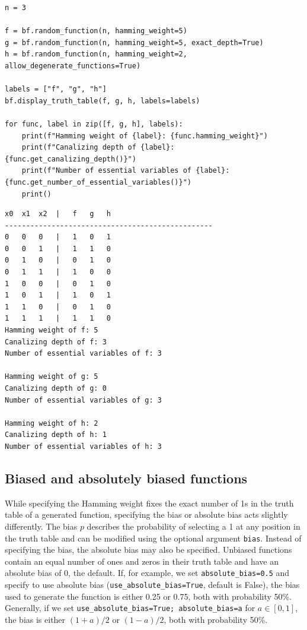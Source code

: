 \documentclass[
]{article}
\begin{document}
\begin{lstlisting}
n = 3

f = bf.random_function(n, hamming_weight=5)
g = bf.random_function(n, hamming_weight=5, exact_depth=True)
h = bf.random_function(n, hamming_weight=2, allow_degenerate_functions=True)

labels = ["f", "g", "h"]
bf.display_truth_table(f, g, h, labels=labels)

for func, label in zip([f, g, h], labels):
    print(f"Hamming weight of {label}: {func.hamming_weight}")
    print(f"Canalizing depth of {label}: {func.get_canalizing_depth()}")
    print(f"Number of essential variables of {label}: {func.get_number_of_essential_variables()}")
    print()
\end{lstlisting}

\begin{lstlisting}
x0  x1  x2  |   f   g   h
-------------------------------------------------
0   0   0   |   1   0   1
0   0   1   |   1   1   0
0   1   0   |   0   1   0
0   1   1   |   1   0   0
1   0   0   |   0   1   0
1   0   1   |   1   0   1
1   1   0   |   0   1   0
1   1   1   |   1   1   0
Hamming weight of f: 5
Canalizing depth of f: 3
Number of essential variables of f: 3

Hamming weight of g: 5
Canalizing depth of g: 0
Number of essential variables of g: 3

Hamming weight of h: 2
Canalizing depth of h: 1
Number of essential variables of h: 3
\end{lstlisting}

\subsection{Biased and absolutely biased
functions}\label{biased-and-absolutely-biased-functions}

While specifying the Hamming weight fixes the exact number of 1s in the
truth table of a generated function, specifying the bias or absolute
bias acts slightly differently. The bias \(p\) describes the probability
of selecting a 1 at any position in the truth table and can be modified
using the optional argument \texttt{bias}. Instead of specifying the
bias, the absolute bias may also be specified. Unbiased functions
contain an equal number of ones and zeros in their truth table and have
an absolute bias of \(0\), the default. If, for example, we set
\texttt{absolute\_bias=0.5} and specify to use absolute bias
(\texttt{use\_absolute\_bias=True}, default is False), the bias used to
generate the function is either 0.25 or 0.75, both with probability
50\%. Generally, if we set
\texttt{use\_absolute\_bias=True;\ absolute\_bias=a} for \(a\in [0,1]\),
the bias is either \((1+a)/2\) or \((1-a)/2\), both with probability
50\%.
\end{document}
